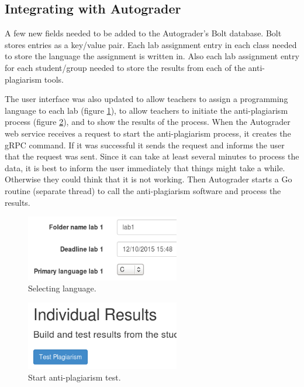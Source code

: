 \documentclass[journal,comsoc]{IEEEtran}
\begin{document}
		\subsection{Integrating with Autograder}
		A few new fields needed to be added to the Autograder's Bolt database. Bolt stores entries as a key/value pair. Each lab assignment entry in each class needed to store the language the assignment is written in. Also each lab assignment entry for each student/group needed to store the results from each of the anti-plagiarism tools.
		
		The user interface was also updated to allow teachers to assign a programming language to each lab (figure \ref{fig:selectLang}), to allow teachers to initiate the anti-plagiarism process (figure \ref{fig:startTest}), and to show the results of the process. When the Autograder web service receives a request to start the anti-plagiarism process, it creates the gRPC command. If it was successful it sends the request and informs the user that the request was sent. Since it can take at least several minutes to process the data, it is best to inform the user immediately that things might take a while. Otherwise they could think that it is not working. Then Autograder starts a Go routine (separate thread) to call the anti-plagiarism software and process the results.
		
		\begin{figure}[h!]
			\includegraphics[width=0.6\textwidth]{SelectingLanguage.png}
			\caption{Selecting language.}
			\label{fig:selectLang}
		\end{figure}
				
		\begin{figure}[h!]
			\includegraphics[width=0.6\textwidth]{StartTest.png}
			\caption{Start anti-plagiarism test.}
			\label{fig:startTest}
		\end{figure}
		
\end{document}
